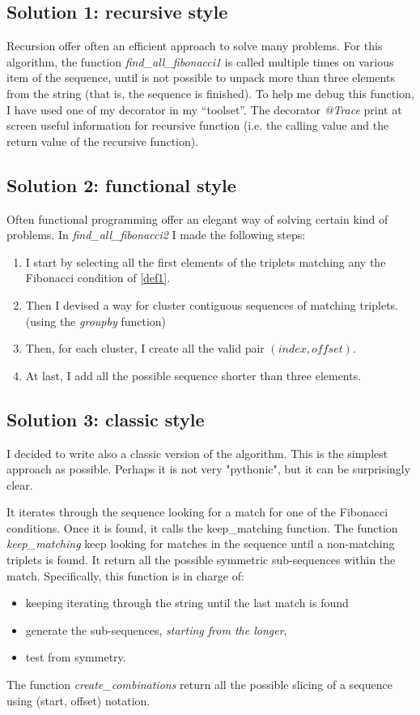 \documentclass[12pt]{article}
\begin{document}
\subsection{Solution 1: recursive style}
Recursion offer often an efficient approach to solve many problems. For this algorithm, the function \emph{find\_all\_fibonacci1} is called multiple times on various item of the sequence, until is not possible to unpack more than three elements from the string (that is, the sequence is finished). To help me debug this function, I have used one of my decorator in my ``toolset''. The decorator \emph{@Trace} print at screen useful information for recursive function (i.e. the calling value and the return value of the recursive function).

\subsection{Solution 2: functional style}
Often functional programming offer an elegant way of solving certain kind of problems. In \emph{find\_all\_fibonacci2} I made the following steps:

\begin{enumerate}
\item I start by selecting all the first elements of the triplets matching any the Fibonacci condition of \ref{def1}.
\item Then I devised a way for cluster contiguous sequences of matching triplets. (using the \emph{groupby} function)
\item Then, for each cluster, I create all the valid pair $(index, offset)$. 
\item At last, I add all the possible sequence shorter than three elements.
\end{enumerate}


\subsection{Solution 3: classic style}
I decided to write also a classic version of the algorithm. This is the simplest approach as possible. Perhaps it is not very "pythonic", but it can be surprisingly clear. 

It iterates through the sequence looking for a match for one of the Fibonacci conditions. Once it is found, it calls the keep\_matching function. The function \emph{keep\_matching} keep looking for matches in the sequence until a non-matching triplets is found. It return all the possible symmetric sub-sequences within the match. Specifically, this function is in charge of:
\begin{itemize}
\item keeping iterating through the string until the last match is found
\item generate the sub-sequences,\emph{ starting from the longer},
\item test from symmetry.
\end{itemize}
The function \emph{create\_combinations} return all the possible slicing of a sequence using (start, offset) notation.
\end{document}
